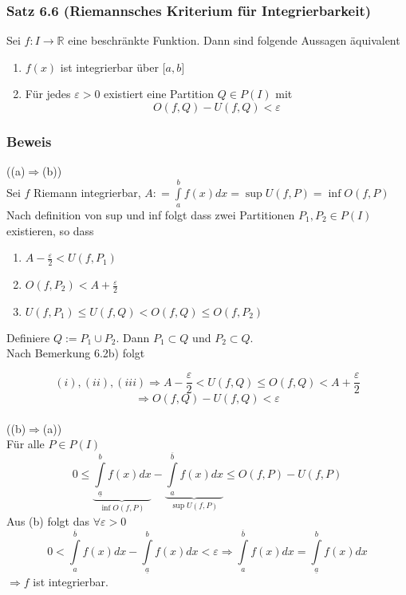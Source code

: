 \subsubsection*{Satz 6.6 (Riemannsches Kriterium für Integrierbarkeit)}
Sei $f:I\rightarrow\mathbb{R}$ eine beschränkte Funktion. Dann sind folgende Aussagen äquivalent
\begin{enumerate}
\item $f(x)$ ist integrierbar über $\lbrack a,b\rbrack$
\item Für jedes $\varepsilon>0$ existiert eine Partition $Q\in P(I)$ mit $$O(f,Q)-U(f,Q)<\varepsilon$$
\end{enumerate}
\subsubsection*{Beweis}
((a)$\Rightarrow$(b))\\
Sei $f$ Riemann integrierbar, $A: = \int\limits_a^b {f(x)dx = \sup U(f,P) = \inf O(f,P)}$\\
Nach definition von sup und inf folgt dass zwei Partitionen $P_1,P_2\in P(I)$ existieren, so dass 

\begin{enumerate}[\indent $(i)$]
\item $A-\frac{\varepsilon}{2}<U(f,P_1)$
\item $O(f,P_2)<A+\frac{\varepsilon}{2}$
\item $U(f,P_1) \leq U(f,Q) < O(f,Q) \leq O(f,P_2)$ 
\end{enumerate} 




Definiere $Q:=P_1\cup P_2$. Dann $P_1\subset Q$ und $P_2 \subset Q$.\\
Nach Bemerkung 6.2b) folgt

$$(i),(ii),(iii) \Rightarrow A-\frac{\varepsilon}{2}<U(f,Q)\leq O(f,Q)<A+\frac{\varepsilon}{2}$$
$$\Rightarrow O(f,Q)-U(f,Q) < \varepsilon$$\\

\noindent((b)$\Rightarrow$(a))\\
Für alle $P\in P(I)$ \[0 \le \underbrace {\int\limits_{\underline{a}}^b {f(x)dx} }_{\inf O(f,P)} - \underbrace {\int\limits_a^{\overline{b}} {f(x)dx} }_{\sup U(f,P)} \le O(f,P) - U(f,P)\]
Aus (b) folgt das $\forall\varepsilon>0$ $$0 < \int\limits_a^{\overline{b}} {f(x)dx - \int\limits_{\underline{a}}^b {f(x)dx < \varepsilon } } \Rightarrow \int\limits_a^{\overline{b}} {f(x)dx = \int\limits_{\underline{a}}^b {f(x)dx} } $$ $\Rightarrow f$ ist integrierbar.

